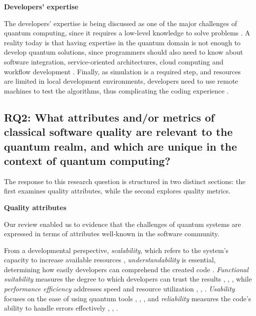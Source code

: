 \noindent\textbf{Developers' expertise}

The developers' expertise is being discussed as one of the major challenges of quantum computing, since it requires a low-level knowledge to solve problems \cite{Moguel2022, De_Maio_Kanatbekova_Zilk_Friis_Guggemos_Brandic_2024}. A reality today is that having expertise in the quantum domain is not enough to develop quantum solutions, since programmers should also need to know about software integration, service-oriented architectures, cloud computing and workflow development \cite{Vietz2021, Sodhi2021, De_Maio_Kanatbekova_Zilk_Friis_Guggemos_Brandic_2024}. Finally, as simulation is a required step, and resources are limited in local development environments, developers need to use remote machines to test the algorithms, thus complicating the coding experience \cite{Sodhi2021}.

\subsection{RQ2: What attributes and/or metrics of classical software quality are relevant to the quantum realm, and which are unique in the context of quantum computing?}

The response to this research question is structured in two distinct sections: the first examines quality attributes, while the second explores quality metrics.

\noindent\textbf{Quality attributes}

Our review enabled us to evidence that the challenges of quantum systems are expressed in terms of attributes well-known in the software community.



From a developmental perspective, \textit{scalability}, which refers to the system's capacity to increase available resources \cite{Elsharkawy2023}, \textit{understandability} is essential, determining how easily developers can comprehend the created code \cite{Elsharkawy2023}. \textit{Functional suitability} measures the degree to which developers can trust the results \cite{Wang2023}, \cite{Faryal2022}, \cite{30}, while \textit{performance efficiency} addresses speed and resource utilization \cite{Wang2023} \cite{Elsharkawy2023}, \cite{Faryal2022}, \cite{30}. \textit{Usability} focuses on the ease of using quantum tools \cite{Wang2023}, \cite{Faryal2022}, \cite{30}, and \textit{reliability} measures the code's ability to handle errors effectively \cite{Wang2023}, \cite{Faryal2022}, \cite{30}.

